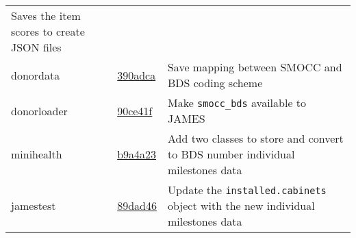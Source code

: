 \documentclass[]{book}
\begin{document}
\begin{longtable}[]{@{}lll@{}}
\begin{minipage}[t]{0.36\columnwidth}
Saves the item scores to create JSON files\strut
\end{minipage}\tabularnewline
\begin{minipage}[t]{0.26\columnwidth}\raggedright
donordata\strut
\end{minipage} & \begin{minipage}[t]{0.29\columnwidth}\raggedright
\href{https://github.com/stefvanbuuren/donordata/commit/1537182a0df4180e0000d59225c6355a9c506472}{390adca}\strut
\end{minipage} & \begin{minipage}[t]{0.36\columnwidth}\raggedright
Save mapping between SMOCC and BDS coding scheme\strut
\end{minipage}\tabularnewline
\begin{minipage}[t]{0.26\columnwidth}\raggedright
donorloader\strut
\end{minipage} & \begin{minipage}[t]{0.29\columnwidth}\raggedright
\href{https://github.com/stefvanbuuren/donorloader/commit/e9a8ed9054ebe1ba3a060883d53cfa0ce1f963d2}{90ce41f}\strut
\end{minipage} & \begin{minipage}[t]{0.36\columnwidth}\raggedright
Make \texttt{smocc\_bds} available to JAMES\strut
\end{minipage}\tabularnewline
\begin{minipage}[t]{0.26\columnwidth}\raggedright
minihealth\strut
\end{minipage} & \begin{minipage}[t]{0.29\columnwidth}\raggedright
\href{https://github.com/stefvanbuuren/minihealth/commit/badf9232605065c6e00cc66bb6c795f7c20ed318}{b9a4a23}\strut
\end{minipage} & \begin{minipage}[t]{0.36\columnwidth}\raggedright
Add two classes to store and convert to BDS number individual milestones data\strut
\end{minipage}\tabularnewline
\begin{minipage}[t]{0.26\columnwidth}\raggedright
jamestest\strut
\end{minipage} & \begin{minipage}[t]{0.29\columnwidth}\raggedright
\href{https://github.com/stefvanbuuren/jamestest/commit/e5dee9bed5b4fdf7f78240da52efa5d865d156ad}{89dad46}\strut
\end{minipage} & \begin{minipage}[t]{0.36\columnwidth}\raggedright
Update the \texttt{installed.cabinets} object with the new individual milestones data\strut
\end{minipage}\tabularnewline
\bottomrule
\end{longtable}


\end{document}
